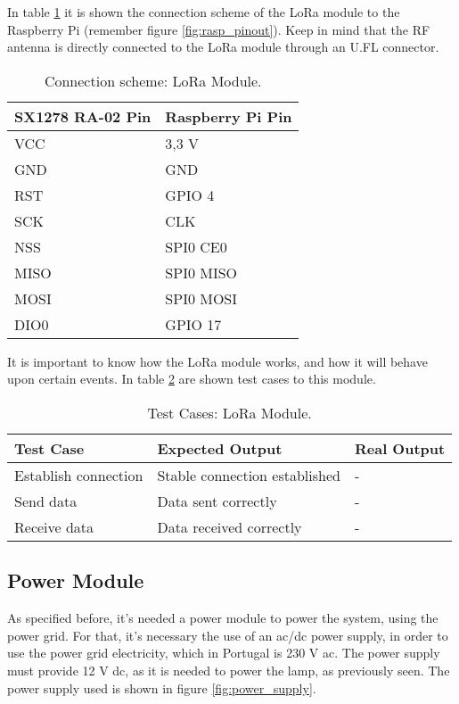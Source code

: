 In table \ref{table:connect_lora} it is shown the connection scheme of the LoRa module to the Raspberry Pi (remember figure \ref{fig:rasp_pinout}). Keep in mind that the RF antenna is directly connected to the LoRa module through an U.FL connector.

\begin{table}[H]
	\centering
	\begin{tabular}{|m{5cm}|m{6cm}|}
		\hline
		\textbf{SX1278 RA-02 Pin} & \textbf{Raspberry Pi Pin}
		\\\hline\hline
		
		VCC & 3,3 V
		\\\hline
		GND & GND
		\\\hline
		RST & GPIO 4
		\\\hline
		SCK & CLK
		\\\hline
		NSS & SPI0 CE0
		\\\hline
		MISO & SPI0 MISO
		\\\hline
		MOSI & SPI0 MOSI
		\\\hline
		DIO0 & GPIO 17
		\\\hline
	\end{tabular}
	
	\caption{Connection scheme: LoRa Module.}
	\label{table:connect_lora}
\end{table}

It is important to know how the LoRa module works, and how it will behave upon certain events. In table \ref{table:test_lora} are shown test cases to this module.

\begin{table}[H]
	\centering
	\resizebox{\columnwidth}{!}
	{
		\begin{tabular}{|m{3cm}|m{5cm}||m{5cm}|}
			\hline
			\textbf{Test Case} & \textbf{Expected Output} & \textbf{Real Output}
			\\\hline\hline
			Establish connection & Stable connection established & -
			\\\hline
			Send data & Data sent correctly & -
			\\\hline
			Receive data & Data received correctly & -
			\\\hline
		\end{tabular}
	}
	\caption{Test Cases: LoRa Module.}
	\label{table:test_lora}
\end{table}

\subsection{Power Module}
As specified before, it's needed a power module to power the system, using the power grid. For that, it's necessary the use of an \ac{ac}/\ac{dc} power supply, in order to use the power grid electricity, which in Portugal is 230 V \ac{ac}. The power supply must provide 12 V \ac{dc}, as it is needed to power the lamp, as previously seen. The power supply used is shown in figure \ref{fig:power_supply}. \cite{power_supply}

